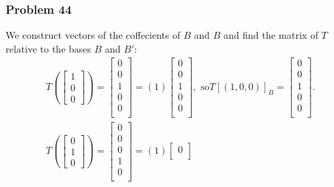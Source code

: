 \documentclass[a4paper,12pt]{article}
\begin{document}
\subsubsection*{Problem 44}
We construct vectors of the coffecients of $B$ and $B$ and find the matrix of $T$ relative to the bases $B$ and $B'$: 
\begin{align*}
    T\left(
        \begin{bmatrix}
            1\\
            0\\
            0
        \end{bmatrix}
    \right) = \begin{bmatrix}
        0\\
        0\\
        1\\
        0\\
        0\\
    \end{bmatrix} = (1) \begin{bmatrix}
        0\\
        0\\
        1\\
        0\\
        0\\
    \end{bmatrix},\text{ so} T[(1,0,0)]_B= \begin{bmatrix}
        0\\
        0\\
        1\\
        0\\
        0\\
    \end{bmatrix}.\\
    T\left(
        \begin{bmatrix}
            0\\
            1\\
            0
        \end{bmatrix}
    \right) = \begin{bmatrix}
        0\\
        0\\
        0\\
        1\\
        0\\
    \end{bmatrix} = (1) \begin{bmatrix}
        0\\

\end{bmatrix}
\end{align*}
\end{document}
